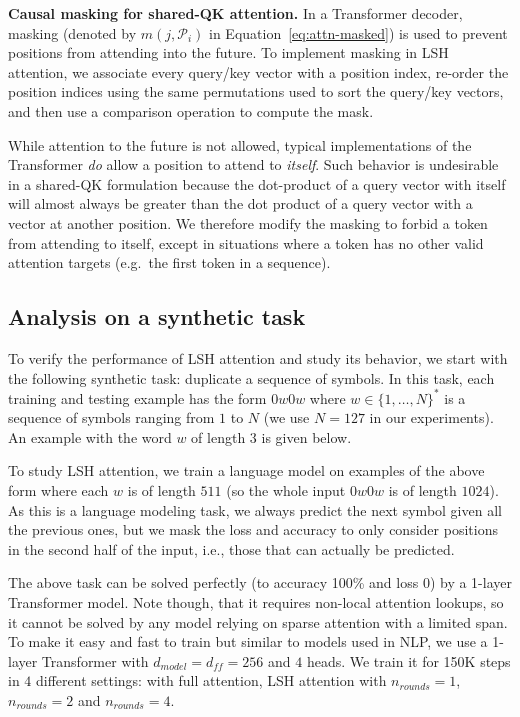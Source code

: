 \textbf{Causal masking for shared-QK attention.} In a Transformer decoder, masking (denoted by $m(j, \mathcal{P}_i)$ in Equation~\ref{eq:attn-masked}) is used to prevent positions from attending into the future. To implement masking in LSH attention, we associate every query/key vector with a position index, re-order the position indices using the same permutations used to sort the query/key vectors, and then use a comparison operation to compute the mask.

While attention to the future is not allowed, typical implementations of the Transformer \emph{do} allow a position to attend to \emph{itself}. Such behavior is undesirable in a shared-QK formulation because the dot-product of a query vector with itself will almost always be greater than the dot product of a query vector with a vector at another position. We therefore modify the masking to forbid a token from attending to itself, except in situations where a token has no other valid attention targets (e.g.\ the first token in a sequence).

\subsection{Analysis on a synthetic task}

To verify the performance of LSH attention and study its behavior, we start with the following synthetic task: duplicate a sequence of symbols. In this task, each training and testing example has the form $0w0w$ where $w \in \{1, \dots, N\}^*$ is a sequence of symbols ranging from $1$ to $N$ (we use $N = 127$ in our experiments). An example with the word $w$ of length $3$ is given below.

\begin{center}

\end{center}

To study LSH attention, we train a language model on examples of the above form where each $w$ is of length $511$ (so the whole input $0w0w$ is of length $1024$). As this is a language modeling task, we always predict the next symbol given all the previous ones, but we mask the loss and accuracy to only consider positions in the second half of the input, i.e., those that can actually be predicted.

The above task can be solved perfectly (to accuracy 100\% and loss 0) by a 1-layer Transformer model. Note though, that it requires non-local attention lookups, so it cannot be solved by any model relying on sparse attention with a limited span. To make it easy and fast to train but similar to models used in NLP, we use a 1-layer Transformer with $d_{model} = d_{ff} = 256$ and $4$ heads. We train it for 150K steps in $4$ different settings: with full attention, LSH attention with $n_{rounds} = 1$, $n_{rounds} = 2$ and $n_{rounds} = 4$.

